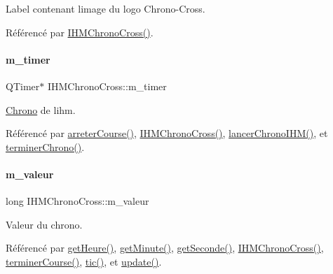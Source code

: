 Label contenant l\textquotesingle{}image du logo Chrono-\/\+Cross. 



Référencé par \hyperlink{class_i_h_m_chrono_cross_a479fc90733fba3e65fb06aa4a3adc02e}{I\+H\+M\+Chrono\+Cross()}.

\mbox{\label{class_i_h_m_chrono_cross_ad29ebde513a6e722cf87aa06e767416a}} 
\paragraph{\texorpdfstring{m\+\_\+timer}{m\_timer}}
{\footnotesize\ttfamily Q\+Timer$\ast$ I\+H\+M\+Chrono\+Cross\+::m\+\_\+timer\hspace{0.3cm}{\ttfamily [private]}}



\hyperlink{class_chrono}{Chrono} de l\textquotesingle{}ihm. 



Référencé par \hyperlink{class_i_h_m_chrono_cross_ad3d8f287d08dd9aa0c6b10c9973672a4}{arreter\+Course()}, \hyperlink{class_i_h_m_chrono_cross_a479fc90733fba3e65fb06aa4a3adc02e}{I\+H\+M\+Chrono\+Cross()}, \hyperlink{class_i_h_m_chrono_cross_a0e78f2d4d5e46c4551fc4517614a56d8}{lancer\+Chrono\+I\+H\+M()}, et \hyperlink{class_i_h_m_chrono_cross_a32ee157ca6bd8c3e94b57f3cecdeee4e}{terminer\+Chrono()}.

\mbox{\label{class_i_h_m_chrono_cross_a4bb2449f0b2cc9891c09fa3e32f56229}} 
\paragraph{\texorpdfstring{m\+\_\+valeur}{m\_valeur}}
{\footnotesize\ttfamily long I\+H\+M\+Chrono\+Cross\+::m\+\_\+valeur\hspace{0.3cm}{\ttfamily [private]}}



Valeur du chrono. 



Référencé par \hyperlink{class_i_h_m_chrono_cross_a42054b4d5246c939bf0f621edb0e1aae}{get\+Heure()}, \hyperlink{class_i_h_m_chrono_cross_a0cee9742e561398390bedb29ef7d6258}{get\+Minute()}, \hyperlink{class_i_h_m_chrono_cross_a0dfb2dc2b85937b1f218584ce84e9d98}{get\+Seconde()}, \hyperlink{class_i_h_m_chrono_cross_a479fc90733fba3e65fb06aa4a3adc02e}{I\+H\+M\+Chrono\+Cross()}, \hyperlink{class_i_h_m_chrono_cross_ac89c6ec3040e8b787f1fbdb670405023}{terminer\+Course()}, \hyperlink{class_i_h_m_chrono_cross_a9706094a679e33f3595e28776596a91b}{tic()}, et \hyperlink{class_i_h_m_chrono_cross_a2cc8b686168528ab0d642a0cba6e1c5a}{update()}.

